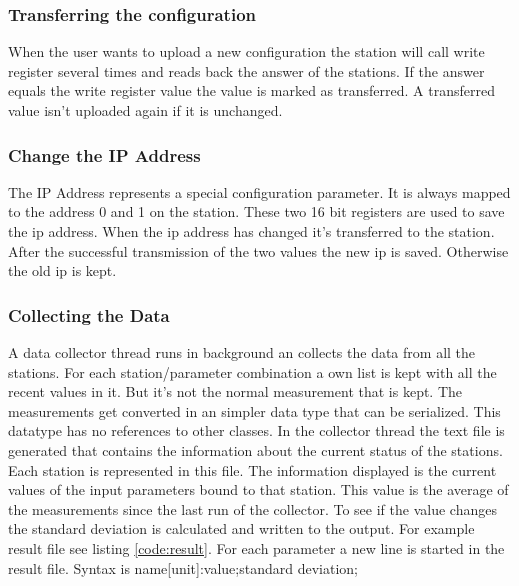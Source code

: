 \subsubsection{Transferring the configuration} %
\label{ssub:transferring_the_configuration}
When the user wants to upload a new configuration the station will call write register several times and reads back the answer of the stations. If the answer equals the write register value the value is marked as transferred. A transferred value isn't uploaded again if it is unchanged.
\subsubsection{Change the IP Address} %
\label{ssub:change_the_ip_address}
The IP Address represents a special configuration parameter. It is always mapped to the address 0 and 1 on the station. These two 16 bit registers are used to save the ip address. When the ip address has changed it's transferred to the station. After the successful transmission of the two values the new ip is saved. Otherwise the old ip is kept.


\subsubsection{Collecting the Data} %
\label{ssub:collecting_the_data}
A data collector thread runs in background an collects the data from all the stations. For each station/parameter combination a own list is kept with all the recent values in it. But it's not the normal measurement that is kept. The measurements get converted in an simpler data type that can be serialized. This datatype has no references to other classes. In the collector thread the text file is generated that contains the information about the current status of the stations. Each station is represented in this file. The information displayed is the current values of the input parameters bound to that station. This value is the average of the measurements since the last run of the collector. To see if the value changes the standard deviation is calculated and written to the output. For example result file see listing \ref{code:result}. 
For each parameter a new line is started in the result file. Syntax is {\C name[unit]:value;standard deviation;}

{\C  }

